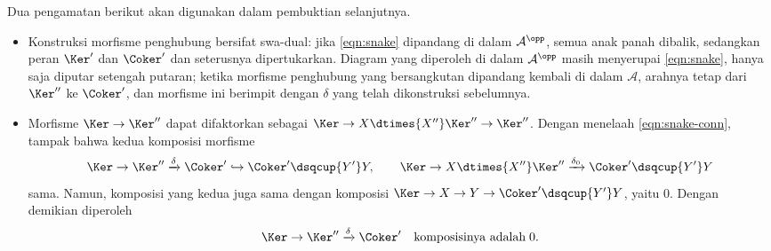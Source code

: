 Dua pengamatan berikut akan digunakan dalam pembuktian selanjutnya.
\begin{itemize}
	\item Konstruksi morfisme penghubung bersifat swa-dual: jika
	\eqref{eqn:snake} dipandang di dalam $\mathcal{A}^{\opp}$, semua anak
	panah dibalik, sedangkan peran $\Ker'$ dan $\Coker'$ dan seterusnya
	dipertukarkan. Diagram yang diperoleh di dalam $\mathcal{A}^{\opp}$
	masih menyerupai \eqref{eqn:snake}, hanya saja diputar setengah putaran;
	ketika morfisme penghubung yang bersangkutan dipandang kembali di dalam
	$\mathcal{A}$, arahnya tetap dari $\Ker''$ ke $\Coker'$, dan morfisme ini
	berimpit dengan $\delta$ yang telah dikonstruksi sebelumnya.
	
	\item Morfisme $\Ker \to \Ker''$ dapat difaktorkan sebagai
	$\Ker \to X \dtimes{X''} \Ker'' \to \Ker''$. Dengan menelaah
	\eqref{eqn:snake-conn}, tampak bahwa kedua komposisi morfisme
	\[ \Ker \to \Ker'' \xrightarrow{\delta} \Coker' \hookrightarrow \Coker' \dsqcup{Y'} Y, \qquad \Ker \to X \dtimes{X''} \Ker'' \xrightarrow{\delta_0} \Coker' \dsqcup{Y'} Y \]
		sama. Namun, komposisi yang kedua juga sama dengan komposisi
	$\Ker \to X \to Y \to \Coker' \dsqcup{Y'} Y $, yaitu $0$. Dengan
	demikian diperoleh
	\begin{equation}\label{eqn:snake-conn-complex}
		\Ker \to \Ker'' \xrightarrow{\delta} \Coker' \quad \text{komposisinya adalah}\; 0.
	\end{equation}
\end{itemize}


